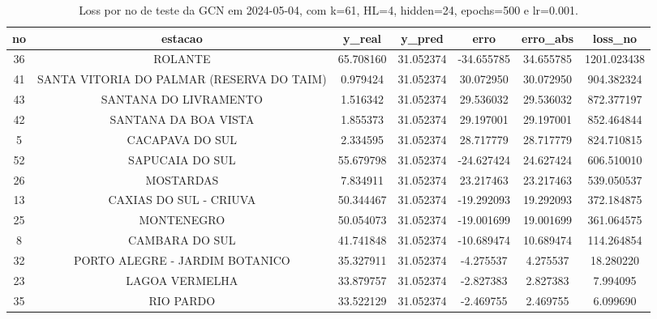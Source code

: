 \begin{table}[h]
\centering
\caption{Loss por no de teste da GCN em 2024-05-04, com k=61, HL=4, hidden=24, epochs=500 e lr=0.001.}
\label{tab:gcn_loss_k61_hl4_h24_e500_d20240504}
\begin{tabular}{ccccccc}
\toprule
no & estacao & y\_real & y\_pred & erro & erro\_abs & loss\_no \\
\midrule
36 & ROLANTE & 65.708160 & 31.052374 & -34.655785 & 34.655785 & 1201.023438 \\
41 & SANTA VITORIA DO PALMAR (RESERVA DO TAIM) & 0.979424 & 31.052374 & 30.072950 & 30.072950 & 904.382324 \\
43 & SANTANA DO LIVRAMENTO & 1.516342 & 31.052374 & 29.536032 & 29.536032 & 872.377197 \\
42 & SANTANA DA BOA VISTA & 1.855373 & 31.052374 & 29.197001 & 29.197001 & 852.464844 \\
5 & CACAPAVA DO SUL & 2.334595 & 31.052374 & 28.717779 & 28.717779 & 824.710815 \\
52 & SAPUCAIA DO SUL & 55.679798 & 31.052374 & -24.627424 & 24.627424 & 606.510010 \\
26 & MOSTARDAS & 7.834911 & 31.052374 & 23.217463 & 23.217463 & 539.050537 \\
13 & CAXIAS DO SUL - CRIUVA & 50.344467 & 31.052374 & -19.292093 & 19.292093 & 372.184875 \\
25 & MONTENEGRO & 50.054073 & 31.052374 & -19.001699 & 19.001699 & 361.064575 \\
8 & CAMBARA DO SUL & 41.741848 & 31.052374 & -10.689474 & 10.689474 & 114.264854 \\
32 & PORTO ALEGRE - JARDIM BOTANICO & 35.327911 & 31.052374 & -4.275537 & 4.275537 & 18.280220 \\
23 & LAGOA VERMELHA & 33.879757 & 31.052374 & -2.827383 & 2.827383 & 7.994095 \\
35 & RIO PARDO & 33.522129 & 31.052374 & -2.469755 & 2.469755 & 6.099690 \\
\bottomrule
\end{tabular}
\end{table}
